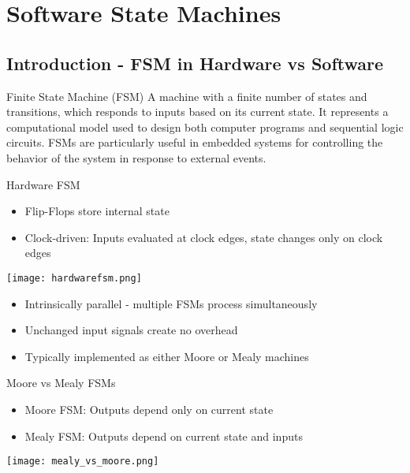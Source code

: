 \section{Software State Machines}


\subsection{Introduction - FSM in Hardware vs Software}

\begin{definition}{Finite State Machine (FSM)}
A machine with a finite number of states and transitions, which responds to inputs based on its current state. It represents a computational model used to design both computer programs and sequential logic circuits. FSMs are particularly useful in embedded systems for controlling the behavior of the system in response to external events.
\end{definition}

\begin{theorem}{Hardware FSM}
    \begin{itemize}
        \item Flip-Flops store internal state
        \item Clock-driven: Inputs evaluated at clock edges, state changes only on clock edges
    \end{itemize}
    \texttt{[image: hardwarefsm.png]}
    \begin{itemize}
    \item Intrinsically parallel - multiple FSMs process simultaneously
    \item Unchanged input signals create no overhead
    \item Typically implemented as either Moore or Mealy machines
\end{itemize}
\end{theorem}

\begin{corollary}{Moore vs Mealy FSMs}
    \begin{itemize}
        \item Moore FSM: Outputs depend only on current state
        \item Mealy FSM: Outputs depend on current state and inputs
    \end{itemize}
    \texttt{[image: mealy\_vs\_moore.png]}
\end{corollary}

